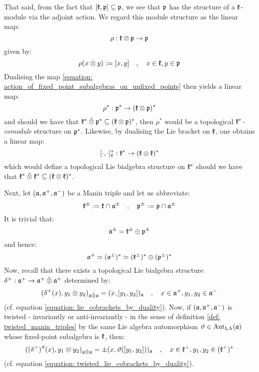        That said, from the fact that $[\mathfrak{k}, \mathfrak{p}] \subseteq \mathfrak{p}$, we see that $\mathfrak{p}$ has the structure of a $\mathfrak{k}$-module via the adjoint action. We regard this module structure as the linear map:
            \begin{equation} \label{equation: action_of_fixed_point_subalgebras_on_unfixed_points}
                \rho: \k \tensor \p \to \p
            \end{equation}
        given by:
            $$\rho(x \tensor y) := [x, y] \quad, \quad x \in \k, y \in \p$$
        Dualising the map \eqref{equation: action_of_fixed_point_subalgebras_on_unfixed_points} then yields a linear map:
            $$\rho^*: \p^* \to (\k \tensor \p)^*$$
        and should we have that $\k^* \hattensor \p^* \subseteq (\k \tensor \p)^*$, then $\rho^*$ would be a topological \textit{$\mathfrak{k}^*$-comodule} structure on $\mathfrak{p}^*$. Likewise, by dualising the Lie bracket on $\mathfrak{k}$, one obtains a linear map:
            $$[\cdot, \cdot]_{\k}^*: \k^* \to (\k \tensor \k)^*$$
        which would define a topological Lie bialgebra structure on $\mathfrak{k}^*$ should we have that $\k^* \hattensor \k^* \subseteq (\k \tensor \k)^*$.

        Next, let $(\mathfrak{a}, \mathfrak{a}^+, \mathfrak{a}^-)$ be a Manin triple and let us abbreviate:
            $$\mathfrak{k}^{\pm} := \mathfrak{k} \cap \mathfrak{a}^{\pm} \quad, \quad \mathfrak{p}^{\pm} := \mathfrak{p} \cap \mathfrak{a}^{\pm}$$
        It is trivial that:
            $$\mathfrak{a}^{\pm} = \mathfrak{k}^{\pm} \oplus \mathfrak{p}^{\pm}$$
        and hence:
            $$\mathfrak{a}^{\mp} \simeq (\mathfrak{a}^{\pm})^* \simeq (\mathfrak{k}^{\pm})^* \oplus (\mathfrak{p}^{\pm})^*$$
        Now, recall that there exists a topological Lie bialgebra structure $\delta^+: \a^+ \to \a^+ \hattensor \a^+$ determined by:
            $$(\delta^+(x), y_1 \tensor y_2)_{\a \hattensor \a} = ( x, [y_1, y_2] )_{\a} \quad, \quad x \in \a^+, y_1, y_2 \in \a^-$$
        (cf. equation \eqref{equation: lie_cobrackets_by_duality}). Now, if $(\mathfrak{a}, \mathfrak{a}^+, \mathfrak{a}^-)$ is twisted - invariantly or anti-invariantly - in the sense of definition \ref{def: twisted_manin_triples} by the same Lie algebra automorphism $\vartheta \in \operatorname{Aut}_{\mathrm{LA}}(\mathfrak{a})$ whose fixed-point subalgebra is $\mathfrak{k}$, then:
            $$((\delta^+)^{\vartheta}(x), y_1 \tensor y_2)_{\a \hattensor \a} = \pm ( x, \vartheta( [y_1, y_2] ) )_{\a} \quad, \quad x \in \k^+, y_1, y_2 \in (\k^+)^*$$
        (cf. equation \eqref{equation: twisted_lie_cobrackets_by_duality}). 
        
